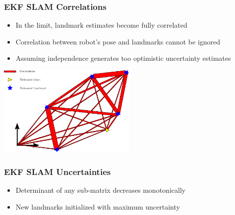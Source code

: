 \begin{frame}
    \frametitle{EKF SLAM Correlations}

    \begin{itemize}
        \item In the limit, landmark estimates become fully correlated
        \item Correlation between robot's pose and landmarks cannot be ignored
        \item Assuming independence generates too optimistic uncertainty estimates
    \end{itemize}

    \begin{center}
        \includegraphics[width=0.5\textwidth]{../images/ekf_slam/ekf_slam_correlations.pdf}
    \end{center}
\end{frame}

\begin{frame}
    \frametitle{EKF SLAM Uncertainties}

    \begin{itemize}
    \item Determinant of any sub-matrix decreases monotonically
    \item New landmarks initialized with maximum uncertainty
    \end{itemize}
\end{frame}

